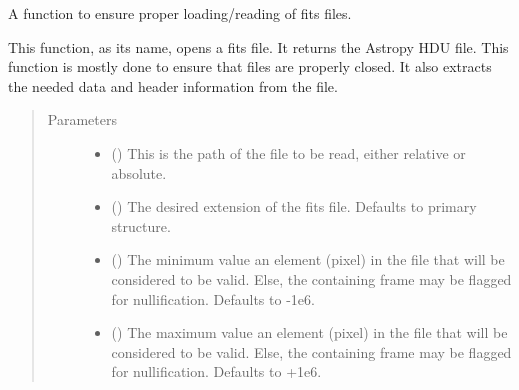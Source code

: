 \documentclass[letterpaper,10pt,english]{sphinxmanual}
\begin{document}
\begin{fulllineitems}
\label{\detokenize{python_docstrings/IfA_Smeargle.meta.io:IfA_Smeargle.meta.io.smeargle_open_fits_file}}
A function to ensure proper loading/reading of fits files.

This function, as its name, opens a fits file. It returns the Astropy HDU
file. This function is mostly done to ensure that files are properly
closed. It also extracts the needed data and header information from the
file.
\begin{quote}\begin{description}
\item[{Parameters}] \leavevmode\begin{itemize}
\item {} 
 () \textendash{} This is the path of the file to be read, either relative or absolute.

\item {} 
 (\sphinxstyleliteralemphasis{\sphinxupquote{ (}}\sphinxstyleliteralemphasis{\sphinxupquote{)}}) \textendash{} The desired extension of the fits file. Defaults to primary structure.

\item {} 
 (\sphinxstyleliteralemphasis{\sphinxupquote{ (}}\sphinxstyleliteralemphasis{\sphinxupquote{)}}) \textendash{} The minimum value an element (pixel) in the file that will be
considered to be valid. Else, the containing frame may be flagged for
nullification. Defaults to -1e6.

\item {} 
 (\sphinxstyleliteralemphasis{\sphinxupquote{ (}}\sphinxstyleliteralemphasis{\sphinxupquote{)}}) \textendash{} The maximum value an element (pixel) in the file that will be
considered to be valid. Else, the containing frame may be flagged for
nullification. Defaults to +1e6.


\end{itemize}
\end{description}
\end{quote}
\end{fulllineitems}
\end{document}

